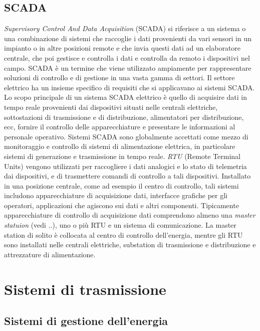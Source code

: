 \subsection{SCADA}
\emph{Supervisory Control And Data Acquisition} (SCADA) si riferisce a un sistema o una combinazione di sistemi che raccoglie i dati provenienti da vari sensori in un impianto o in altre posizioni remote e che invia questi dati ad un elaboratore centrale, che poi gestisce e controlla i dati e controlla da remoto i dispositivi nel campo. SCADA è un termine che viene utilizzato ampiamente per rappresentare soluzioni di controllo e di gestione in una vasta gamma di settori. Il settore elettrico ha un insieme specifico di requisiti che si applicavano ai sistemi SCADA. Lo scopo principale di un sistema SCADA elettrico è quello di acquisire dati in tempo reale provenienti dai dispositivi situati nelle centrali elettriche, sottostazioni di trasmissione e di distribuzione, alimentatori per distribuzione, ecc, fornire il controllo delle apparecchiature e presentare le informazioni al personale operativo.  
\newline
Sistemi SCADA sono globalmente accettati come mezzo di monitoraggio e controllo di sistemi di alimentazione elettrica, in particolare sistemi di generazione e trasmissione in tempo reale. \emph{RTU} (Remote Terminal Units) vengono utilizzati per raccogliere i dati analogici e lo stato di telemetria dai dispositivi, e di trasmettere comandi di controllo a tali dispositivi. Installato in una posizione centrale, come ad esempio il centro di controllo, tali sistemi includono apparecchiature di acquisizione dati, interfacce grafiche per gli operatori, applicazioni che agiscono sui dati e altri componenti. 
\newline
Tipicamente apparecchiature di controllo di acquisizione dati comprendono almeno una \emph{master statuion} (vedi ..), uno o più RTU e un sistema di comunicazione. La master station di solito è collocata al centro di controllo dell'energia, mentre gli RTU sono installati nelle centrali elettriche, substation di trasmissione e distribuzione e attrezzature di alimentazione.

\section{Sistemi di trasmissione}

\subsection{Sistemi di gestione dell'energia}
